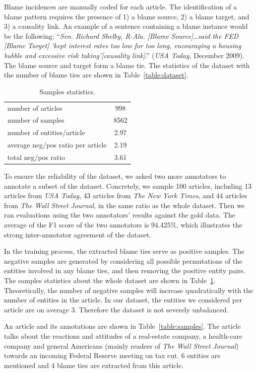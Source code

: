 \documentclass[letterpaper]{article}
\begin{document}
Blame incidences are manually coded for each article. The identification of a blame pattern requires the presence of 1) a blame source, 2) a blame target, and 3) a causality link. An example of a sentence containing a blame instance would be the following: ``{\it Sen. Richard Shelby, R-Ala. [Blame Source]\ldots said the FED [Blame Target] `kept interest rates too low for too long, encouraging a housing bubble and excessive risk taking'[causality link]}.'' ({\it USA Today}, December 2009). The blame source and target form a blame tie. The statistics of the dataset with the number of blame ties are shown in Table~\ref{table:dataset}.

\begin{table}[t!]
\centering
\begin{tabular}{l c} 
 \hline
 number of articles & 998 \\ 
 number of samples & 8562 \\
 number of entities/article & 2.97 \\
 average neg/pos ratio per article & 2.19 \\
 total neg/pos ratio & 3.61 \\
 \hline
\end{tabular}
\caption{Samples statistics.}
\label{table:samplestats}
\end{table}

To ensure the reliability of the dataset, we asked two more annotators to annotate a subset of the dataset. Concretely, we sample 100 articles, including 13 articles from {\it USA Today}, 43 articles from {\it The New York Times}, and 44 articles from {\it The Wall Street Journal}, in the same ratio as the whole dataset. Then we ran evaluations using the two annotators' results against the gold data. The average of the F1 score of the two annotators is 94.425\%, which illustrates the strong inter-annotator agreement of the dataset.

In the training process, the extracted blame ties serve as positive samples. The negative samples are generated by considering all possible permutations of the entities involved in any blame ties, and then removing the positive entity pairs. The samples statistics about the whole dataset are shown in Table~\ref{table:samplestats}. Theoretically, the number of negative samples will increase quadratically with the number of entities in the article. In our dataset, the entities we considered per article are on average 3. Therefore the dataset is not severely unbalanced.

An article and its annotations are shown in Table~\ref{table:samples}. The article talks about the reactions and attitudes of a real-estate company, a health-care company and general Americans (mainly readers of {\it The Wall Street Journal}) towards an incoming Federal Reserve meeting on tax cut. 6 entities are mentioned and 4 blame ties are extracted from this article.
\end{document}
